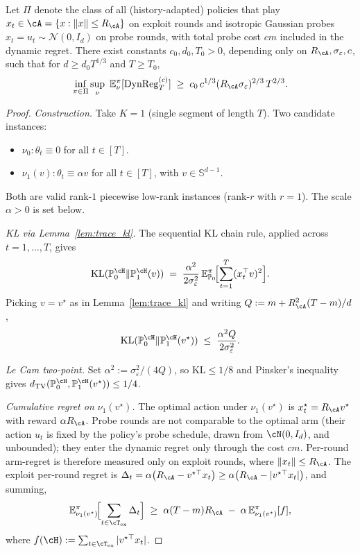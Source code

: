 \begin{theorem}
\label{thm:spsc_lb_sharp}
Let $\Pi$ denote the class of all (history-adapted) policies that play
$x_t\in\cA = \{x : \|x\|\le R_\cA\}$ on exploit rounds and isotropic
Gaussian probes $x_t=u_t\sim\mathcal N(0,I_d)$ on probe rounds, with
total probe cost $cm$ included in the dynamic regret. There exist
constants $c_0,d_0,T_0>0$, depending only on
$R_\cA,\sigma_\varepsilon,c$, such that for $d\ge d_0 T^{1/3}$ and
$T\ge T_0$,
\[
\inf_{\pi\in\Pi}\sup_\nu\ \mathbb E^\pi_\nu[\mathrm{DynReg}_T^{(c)}]
\;\ge\; c_0\,c^{1/3}(R_\cA\sigma_\varepsilon)^{2/3}\,T^{2/3}.
\]
\end{theorem}

\begin{proof}
\emph{Construction.} Take $K=1$ (single segment of length $T$). Two
candidate instances:
\begin{itemize}
\item $\nu_0:\theta_t\equiv 0$ for all $t\in[T]$.
\item $\nu_1(v):\theta_t\equiv\alpha v$ for all $t\in[T]$, with $v\in\mathbb S^{d-1}$.
\end{itemize}
Both are valid rank-$1$ piecewise low-rank instances (rank-$r$ with
$r=1$). The scale $\alpha>0$ is set below.

\emph{KL via Lemma~\ref{lem:trace_kl}.} The sequential KL chain rule,
applied across $t=1,\dots,T$, gives
\[
\mathrm{KL}(\mathbb P_0^\cH\|\mathbb P_1^\cH(v))
\;=\; \frac{\alpha^2}{2\sigma_\varepsilon^2}\,
\mathbb E^\pi_{\mathbb P_0}\!\Bigl[\sum_{t=1}^T (x_t^\top v)^2\Bigr].
\]
Picking $v=v^\star$ as in Lemma~\ref{lem:trace_kl} and writing
$Q := m + R_\cA^2(T-m)/d$,
\begin{equation}
\mathrm{KL}(\mathbb P_0^\cH\|\mathbb P_1^\cH(v^\star))
\;\le\; \frac{\alpha^2 Q}{2\sigma_\varepsilon^2}.
\label{eq:singleseg_KL}
\end{equation}

\emph{Le Cam two-point.} Set
$\alpha^2 := \sigma_\varepsilon^2/(4Q)$, so
$\mathrm{KL}\le 1/8$ and Pinsker's inequality gives
$d_{\mathrm{TV}}(\mathbb P_0^\cH,\mathbb P_1^\cH(v^\star))\le 1/4$.

\emph{Cumulative regret on $\nu_1(v^\star)$.} The optimal action under
$\nu_1(v^\star)$ is $x_t^\star = R_\cA v^\star$ with reward
$\alpha R_\cA$. Probe rounds are not comparable to the optimal arm
(their action $u_t$ is fixed by the policy's probe schedule, drawn from
$\cN(0,I_d)$, and unbounded); they enter the dynamic regret only
through the cost $cm$. Per-round arm-regret is therefore
measured only on exploit rounds, where $\|x_t\|\le R_\cA$. The exploit
per-round regret is
$\Delta_t = \alpha\bigl(R_\cA - v^{\star\top} x_t\bigr)
\ge \alpha\bigl(R_\cA - |v^{\star\top} x_t|\bigr)$, and summing,
\begin{equation}
\mathbb E^\pi_{\nu_1(v^\star)}\!\Bigl[\sum_{t\in\cT_{\mathrm{ex}}}\Delta_t\Bigr]
\;\ge\; \alpha (T-m) R_\cA
\;-\; \alpha\,\mathbb E^\pi_{\nu_1(v^\star)}[f],
\label{eq:reg_to_alignment}
\end{equation}
where $f(\cH) := \sum_{t\in\cT_{\mathrm{ex}}} |v^{\star\top}x_t|$.


\end{proof}
